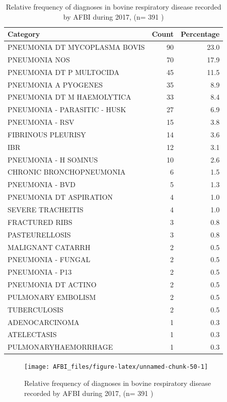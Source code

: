 \documentclass[]{book}
\begin{document}
\begin{table}

\caption{\label{tab:unnamed-chunk-49}Relative frequency of diagnoses in bovine respiratory disease recorded by AFBI during 2017, (n= 391 )}
\centering
\begin{tabular}[t]{l|r|r}
\hline
Category & Count & Percentage\\
\hline
PNEUMONIA DT MYCOPLASMA BOVIS & 90 & 23.0\\
\hline
PNEUMONIA NOS & 70 & 17.9\\
\hline
PNEUMONIA DT P MULTOCIDA & 45 & 11.5\\
\hline
PNEUMONIA A PYOGENES & 35 & 8.9\\
\hline
PNEUMONIA DT M HAEMOLYTICA & 33 & 8.4\\
\hline
PNEUMONIA - PARASITIC - HUSK & 27 & 6.9\\
\hline
PNEUMONIA - RSV & 15 & 3.8\\
\hline
FIBRINOUS PLEURISY & 14 & 3.6\\
\hline
IBR & 12 & 3.1\\
\hline
PNEUMONIA - H SOMNUS & 10 & 2.6\\
\hline
CHRONIC BRONCHOPNEUMONIA & 6 & 1.5\\
\hline
PNEUMONIA - BVD & 5 & 1.3\\
\hline
PNEUMONIA DT ASPIRATION & 4 & 1.0\\
\hline
SEVERE TRACHEITIS & 4 & 1.0\\
\hline
FRACTURED RIBS & 3 & 0.8\\
\hline
PASTEURELLOSIS & 3 & 0.8\\
\hline
MALIGNANT CATARRH & 2 & 0.5\\
\hline
PNEUMONIA - FUNGAL & 2 & 0.5\\
\hline
PNEUMONIA - P13 & 2 & 0.5\\
\hline
PNEUMONIA DT ACTINO & 2 & 0.5\\
\hline
PULMONARY EMBOLISM & 2 & 0.5\\
\hline
TUBERCULOSIS & 2 & 0.5\\
\hline
ADENOCARCINOMA & 1 & 0.3\\
\hline
ATELECTASIS & 1 & 0.3\\
\hline
PULMONARYHAEMORRHAGE & 1 & 0.3\\
\hline
\end{tabular}
\end{table}

\begin{figure}

{\centering \texttt{[image: AFBI\_files/figure-latex/unnamed-chunk-50-1]} 

}

\caption{Relative frequency of diagnoses in bovine respiratory disease recorded by AFBI during 2017, (n= 391 )}\label{fig:unnamed-chunk-50}
\end{figure}
\end{document}
